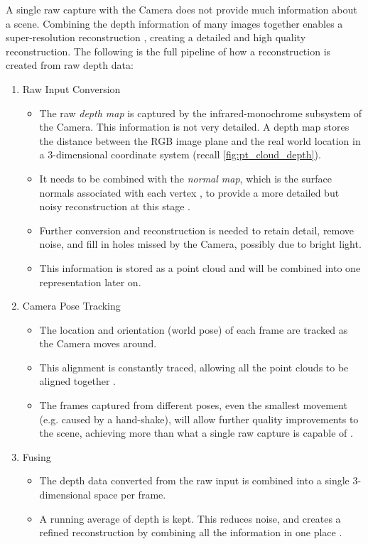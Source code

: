 A single raw capture with the Camera does not provide much information about a scene. Combining the depth information of many images together enables a super-resolution reconstruction \cite{ms-3d-paper}, creating a detailed and high quality reconstruction. The following is the full pipeline of how a reconstruction is created from raw depth data:
\newpage
\begin{enumerate}
  \item Raw Input Conversion
    \begin{itemize}
      \item The raw \textit{depth map} is captured by the infrared-monochrome subsystem of the Camera. This information is not very detailed. A depth map stores the distance between the RGB image plane and the real world location in a 3-dimensional coordinate system (recall \autoref{fig:pt_cloud_depth}).
      \item It needs to be combined with the \textit{normal map}, which is the surface normals associated with each vertex \cite{szeliski-book}, to provide a more detailed but noisy reconstruction at this stage \cite{kinect-doc}. 
      \item Further conversion and reconstruction is needed to retain detail, remove noise, and fill in holes missed by the Camera, possibly due to bright light.
      \item This information is stored as a point cloud and will be combined into one representation later on.
    \end{itemize}

  \item Camera Pose Tracking
    \begin{itemize}
      \item The location and orientation (world pose) of each frame are tracked as the Camera moves around.
      \item This alignment is constantly traced, allowing all the point clouds to be aligned together \cite{kinect-doc}. 
      \item The frames captured from different poses, even the smallest movement (e.g. caused by a hand-shake), will allow further quality improvements to the scene, achieving more than what a single raw capture is capable of \cite{ms-3d-paper}.
    \end{itemize}

  \item Fusing 
    \begin{itemize}
      \item The depth data converted from the raw input is combined into a single 3-dimensional space per frame.
      \item A running average of depth is kept. This reduces noise, and creates a refined reconstruction by combining all the information in one place \cite{kinect-doc} \cite{ms-3d-paper}. 
    \end{itemize}


\end{enumerate}
